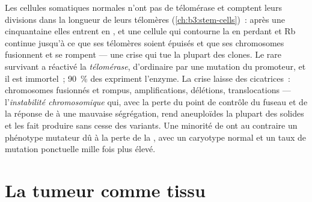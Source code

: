 \begin{definition}\label{def:b3:cancer-biology:telomerase}
Les cellules somatiques normales n'ont pas de télomérase et comptent
leurs divisions dans la longueur de leurs télomères
(\cref{ch:b3:stem-cells})~: après une cinquantaine elles entrent en
, et une cellule qui contourne la  en perdant 
et Rb continue jusqu'à ce que ses télomères soient épuisés et que ses
chromosomes fusionnent et se rompent --- une crise qui tue la plupart
des clones. Le rare survivant a réactivé la \emph{télomérase},
d'ordinaire par une mutation du promoteur, et il est immortel~;
\qty{90}{\%} des  expriment l'enzyme. La crise laisse des
cicatrices~: chromosomes fusionnés et rompus, amplifications,
délétions, translocations --- l'\emph{instabilité chromosomique} qui,
avec la perte du point de contrôle du fuseau et de la réponse de  à
une mauvaise ségrégation, rend aneuploïdes la plupart des 
solides et les fait produire sans cesse des variants. Une minorité de
 ont au contraire un phénotype mutateur dû à la perte de la
, avec un caryotype normal et un taux de
mutation ponctuelle mille fois plus élevé.
\end{definition}

\section{La tumeur comme tissu}

